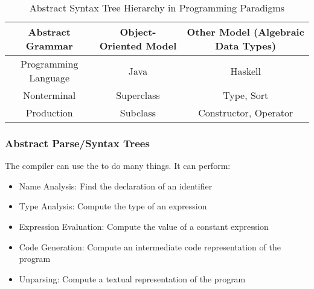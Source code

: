 \begin{table}[h!]
  \centering
  \begin{tabular}{ccc}
    \toprule
    \textbf{Abstract Grammar} & \textbf{Object-Oriented Model} & \textbf{Other Model} (Algebraic Data Types) \\
    \midrule
    Programming Language & Java & Haskell \\
    Nonterminal & Superclass & Type, Sort \\
    Production & Subclass & Constructor, Operator \\
    \bottomrule
  \end{tabular}
  \caption{Abstract Syntax Tree Hierarchy in Programming Paradigms}
  \label{tab:Abstract_Syntax_Tree_Programming_Paradigms}
\end{table}

\subsubsection{Abstract Parse/Syntax Trees}\label{subsubsec:Abstract_Parse_Trees}
The compiler can use the  to do many things.
It can perform:
\begin{itemize}[noitemsep]
\item Name Analysis: Find the declaration of an identifier
\item Type Analysis: Compute the type of an expression
\item Expression Evaluation: Compute the value of a constant expression
\item Code Generation: Compute an intermediate code representation of the program
\item Unparsing: Compute a textual representation of the program
\end{itemize}


